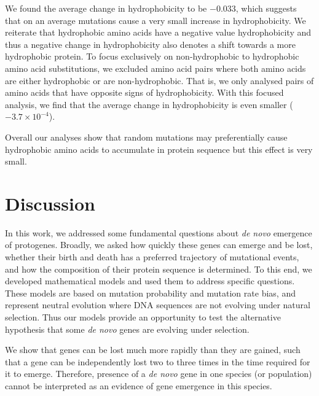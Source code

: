 \documentclass[12pt,a4paper]{article}
\begin{document}
We found the average change in hydrophobicity to be $-0.033$, which suggests that on an average mutations cause a very small increase in hydrophobicity. We reiterate that hydrophobic amino acids have a negative value hydrophobicity and thus a negative change in hydrophobicity also denotes a shift towards a more hydrophobic protein. To focus exclusively on non-hydrophobic to hydrophobic amino acid substitutions, we excluded amino acid pairs where both amino acids are either hydrophobic or are non-hydrophobic. That is, we only analysed pairs of amino acids that have opposite signs of hydrophobicity. With this focused analysis, we find that the average change in hydrophobicity is even smaller ($-3.7\times 10^{-4}$).

Overall our analyses show that random mutations may preferentially cause hydrophobic amino acids to accumulate in protein sequence but this effect is very small.

\section{Discussion} 

In this work, we addressed some fundamental questions about \textit{de novo} emergence of protogenes. Broadly, we asked how quickly these genes can emerge and be lost, whether their birth and death has a preferred trajectory of mutational events, and how the composition of their protein sequence is determined. To this end, we developed mathematical models and used them to address specific questions. These models are based on mutation probability and mutation rate bias, and represent neutral evolution where DNA sequences are not evolving under natural selection. Thus our models provide an opportunity to test the alternative hypothesis that some \textit{de novo} genes are evolving under selection.

We show that genes can be lost much more rapidly than they are gained, such that a gene can be independently lost two to three times in the time required for it to emerge. Therefore, presence of a \textit{de novo} gene in one species (or population) cannot be interpreted as an evidence of gene emergence in this species.
\end{document}
